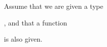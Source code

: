 \documentclass{article}
\begin{document}
Assume that we are given a type
%
\begin{code}[hide]%
%
\>[2]\AgdaSpace{}%
\AgdaModule{\AgdaUnderscore{}}\AgdaSpace{}%
\AgdaSymbol{(}\<%
\end{code}
\begin{code}[inline]%
\>[2][@{}l@{\AgdaIndent{1}}]%
\>[4]\AgdaSpace{}%
\AgdaSymbol{:}\AgdaSpace{}%
\<%
\end{code}
\begin{code}[hide]%
%
\>[4]\AgdaSymbol{)}\AgdaSpace{}%
\AgdaSymbol{(}\<%
\end{code}
%
,
and that a function
%
\begin{code}[inline*]%
%
\>[4]\AgdaSpace{}%
\AgdaSymbol{:}\AgdaSpace{}%
\AgdaSpace{}%
\AgdaSpace{}%
\AgdaSpace{}%
\AgdaSpace{}%
\AgdaSpace{}%
\AgdaSpace{}%
\<%
\end{code}
\begin{code}[hide]%
%
\>[4]\AgdaSymbol{)}\AgdaSpace{}%
\<%
\end{code}
%
is also given.
\end{document}
